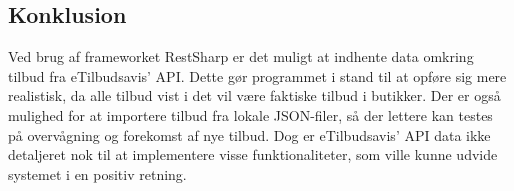 \subsection{Konklusion}
Ved brug af frameworket RestSharp er det muligt at indhente data omkring tilbud fra eTilbudsavis' API. 
Dette gør programmet i stand til at opføre sig mere realistisk, da alle tilbud vist i det vil være faktiske tilbud i butikker.
Der er også mulighed for at importere tilbud fra lokale JSON-filer, så der lettere kan testes på overvågning og forekomst af nye tilbud. 
Dog er eTilbudsavis' API data ikke detaljeret nok til at implementere visse funktionaliteter, som ville kunne udvide systemet i en positiv retning.
